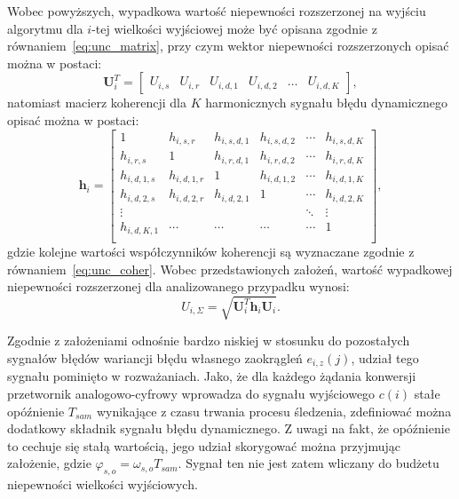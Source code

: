 Wobec powyższych, wypadkowa wartość niepewności rozszerzonej na wyjściu algorytmu dla $i$-tej wielkości wyjściowej może być opisana zgodnie z równaniem~\eqref{eq:unc_matrix}, przy czym wektor niepewności rozszerzonych opisać można w postaci:
\begin{equation}
\mathbf{U}_{i}^{T} =
\begin{bmatrix}
U_{i,s} & U_{i,r} & U_{i,d,1} & U_{i,d,2} & \hdots & U_{i,d,K}
\end{bmatrix}
\label{eq:pom_uncout_uncvect},
\end{equation}
natomiast macierz koherencji dla $K$ harmonicznych sygnału błędu dynamicznego opisać można w postaci:
\begin{equation}
\mathbf{h}_{i} =
\begin{bmatrix}
1           & h_{i,s,r}   & h_{i,s,d,1} & h_{i,s,d,2} & \cdots & h_{i,s,d,K} \\
h_{i,r,s}   & 1           & h_{i,r,d,1} & h_{i,r,d,2} & \cdots & h_{i,r,d,K} \\
h_{i,d,1,s} & h_{i,d,1,r} & 1           & h_{i,d,1,2} & \cdots & h_{i,d,1,K} \\
h_{i,d,2,s} & h_{i,d,2,r} & h_{i,d,2,1} & 1           & \cdots & h_{i,d,2,K} \\
\vdots      &             &             &             & \ddots & \vdots      \\
h_{i,d,K,1} & \cdots      & \cdots      & \cdots      & \cdots & 1           \\
\end{bmatrix}
\label{eq:pom_uncout_cohers},
\end{equation}
gdzie kolejne wartości współczynników koherencji są wyznaczane zgodnie z równaniem~\eqref{eq:unc_coher}. Wobec przedstawionych założeń, wartość wypadkowej niepewności rozszerzonej dla analizowanego przypadku wynosi:
\begin{equation}
U_{i,\Sigma} = \sqrt{\mathbf{U}_{i}^{T} \mathbf{h}_{i} \mathbf{U}_{i}} \label{eq:pom_uncout_sum}.
\end{equation}

Zgodnie z założeniami odnośnie bardzo niskiej w stosunku do pozostałych sygnałów błędów wariancji błędu własnego zaokrągleń $e_{i,z}(j)$, udział tego sygnału pominięto w rozważaniach. Jako, że dla każdego żądania konwersji przetwornik analogowo-cyfrowy wprowadza do sygnału wyjściowego $c(i)$ stałe opóźnienie $T_{sam}$ wynikające z czasu trwania procesu śledzenia, zdefiniować można dodatkowy składnik sygnału błędu dynamicznego. Z uwagi na fakt, że opóźnienie to cechuje się stałą wartością, jego udział skorygować można przyjmując założenie, gdzie $\varphi_{s,o} = \omega_{s,o} T_{sam}$. Sygnał ten nie jest zatem wliczany do budżetu niepewności wielkości wyjściowych.

